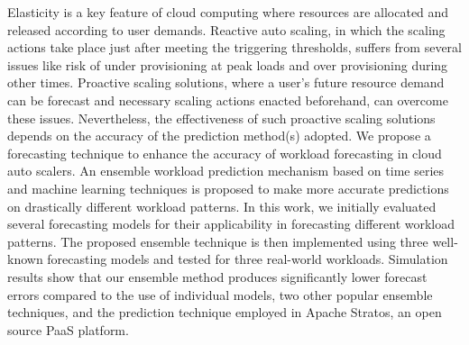 Elasticity is a key feature of cloud computing where resources are allocated and released according to user demands. Reactive auto scaling, in which the scaling actions take place just after meeting the triggering thresholds, suffers from several issues like risk of under provisioning at peak loads and over provisioning during other times. Proactive scaling solutions, where a user's future resource demand can be forecast and necessary scaling actions enacted beforehand, can overcome these issues. Nevertheless, the effectiveness of such proactive scaling solutions depends on the accuracy of the prediction method(s) adopted. We propose a forecasting technique to enhance the accuracy of workload forecasting in cloud auto scalers. An ensemble workload prediction mechanism based on time series and machine learning techniques is proposed to make more accurate predictions on drastically different workload patterns. In this work, we initially evaluated several forecasting models for their applicability in forecasting different workload patterns. The proposed ensemble technique is then implemented using three well-known forecasting models and tested for three real-world workloads. Simulation results show that our ensemble method produces significantly lower forecast errors compared to the use of individual models, two other popular ensemble techniques, and the prediction technique employed in Apache Stratos, an open source PaaS platform.